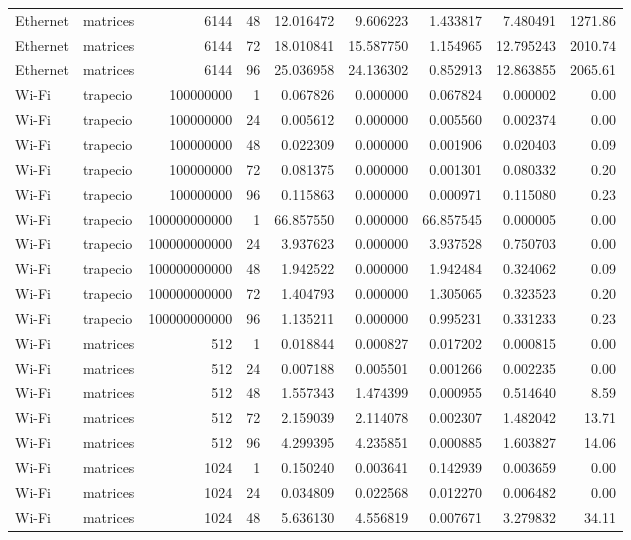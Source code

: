 \begin{longtable}{llrrrrrrr}
Ethernet & matrices & 6144 & 48 & 12.016472 & 9.606223 & 1.433817 & 7.480491 & 1271.86 \\
Ethernet & matrices & 6144 & 72 & 18.010841 & 15.587750 & 1.154965 & 12.795243 & 2010.74 \\
Ethernet & matrices & 6144 & 96 & 25.036958 & 24.136302 & 0.852913 & 12.863855 & 2065.61 \\
Wi-Fi & trapecio & 100000000 & 1 & 0.067826 & 0.000000 & 0.067824 & 0.000002 & 0.00 \\
Wi-Fi & trapecio & 100000000 & 24 & 0.005612 & 0.000000 & 0.005560 & 0.002374 & 0.00 \\
Wi-Fi & trapecio & 100000000 & 48 & 0.022309 & 0.000000 & 0.001906 & 0.020403 & 0.09 \\
Wi-Fi & trapecio & 100000000 & 72 & 0.081375 & 0.000000 & 0.001301 & 0.080332 & 0.20 \\
Wi-Fi & trapecio & 100000000 & 96 & 0.115863 & 0.000000 & 0.000971 & 0.115080 & 0.23 \\
Wi-Fi & trapecio & 100000000000 & 1 & 66.857550 & 0.000000 & 66.857545 & 0.000005 & 0.00 \\
Wi-Fi & trapecio & 100000000000 & 24 & 3.937623 & 0.000000 & 3.937528 & 0.750703 & 0.00 \\
Wi-Fi & trapecio & 100000000000 & 48 & 1.942522 & 0.000000 & 1.942484 & 0.324062 & 0.09 \\
Wi-Fi & trapecio & 100000000000 & 72 & 1.404793 & 0.000000 & 1.305065 & 0.323523 & 0.20 \\
Wi-Fi & trapecio & 100000000000 & 96 & 1.135211 & 0.000000 & 0.995231 & 0.331233 & 0.23 \\
Wi-Fi & matrices & 512 & 1 & 0.018844 & 0.000827 & 0.017202 & 0.000815 & 0.00 \\
Wi-Fi & matrices & 512 & 24 & 0.007188 & 0.005501 & 0.001266 & 0.002235 & 0.00 \\
Wi-Fi & matrices & 512 & 48 & 1.557343 & 1.474399 & 0.000955 & 0.514640 & 8.59 \\
Wi-Fi & matrices & 512 & 72 & 2.159039 & 2.114078 & 0.002307 & 1.482042 & 13.71 \\
Wi-Fi & matrices & 512 & 96 & 4.299395 & 4.235851 & 0.000885 & 1.603827 & 14.06 \\
Wi-Fi & matrices & 1024 & 1 & 0.150240 & 0.003641 & 0.142939 & 0.003659 & 0.00 \\
Wi-Fi & matrices & 1024 & 24 & 0.034809 & 0.022568 & 0.012270 & 0.006482 & 0.00 \\
Wi-Fi & matrices & 1024 & 48 & 5.636130 & 4.556819 & 0.007671 & 3.279832 & 34.11 \\

\end{longtable}
